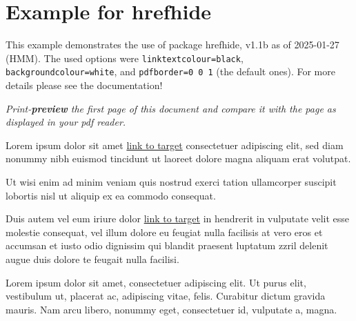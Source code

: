 \documentclass[british]{article}[2024/06/29]%
\begin{document}
\section*{Example for hrefhide}

This example demonstrates the use of package\newline
\textsf{hrefhide}, v1.1b as of 2025-01-27 (HMM).\newline
The used options were \texttt{linktextcolour=black},
\texttt{backgroundcolour=white}, and \texttt{pdfborder={0 0 1}}
(the default ones).\newline
For more details please see the documentation!\bigskip

\textit{Print-\textbf{preview} the first page of this document
and compare it with the page as displayed in your pdf reader.}\bigskip

Lorem ipsum dolor sit amet \href{\#target}{link to target} consectetuer
adipiscing elit, sed diam nonummy nibh euismod tincidunt ut laoreet
dolore magna aliquam erat volutpat.

Ut wisi enim ad minim
veniam  quis nostrud
exerci tation ullamcorper suscipit lobortis nisl ut aliquip ex ea
commodo consequat.

Duis autem vel eum iriure dolor \href{\#target}{link to target} in
hendrerit in vulputate velit esse molestie consequat, vel illum dolore
eu feugiat nulla facilisis at vero eros et accumsan et iusto odio
dignissim qui blandit praesent luptatum zzril delenit augue
duis dolore te feugait nulla facilisi.

\noindent \textbf{\textsf{%
}}\linebreak

Lorem ipsum dolor sit amet, consectetuer adipiscing elit. Ut purus elit,
vestibulum ut, placerat ac, adipiscing vitae, felis. Curabitur dictum gravida
mauris. Nam arcu libero, nonummy eget, consectetuer id, vulputate a, magna.
\end{document}
